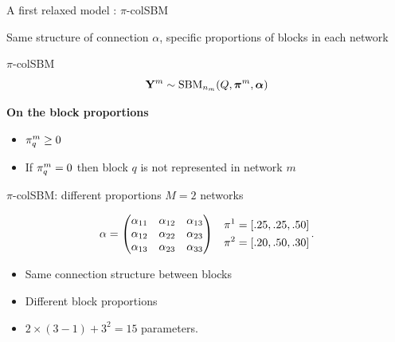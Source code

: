 \documentclass[compress,10pt]{beamer}
\begin{document}
\begin{frame}{A first relaxed model : $\pi$-colSBM}

Same structure of connection  $\alpha$, specific proportions of blocks in each network
 
 
\begin{block}{$\pi$-colSBM}
 \begin{equation*}\label{mod:iid}
\mathbf{Y}^m \sim \mbox{SBM}_{n_m}(Q, \boldsymbol{\pi}^m, \boldsymbol{\alpha})
\end{equation*}
 
\end{block}

\textbf{On the block proportions}
\begin{itemize}
\item  $\pi^{m}_q \geq 0$
\item If $\pi^{m}_q=0$ then  block $q$ is not represented in network $m$
\end{itemize}
\end{frame}

\begin{frame}{$\pi$-colSBM:  different proportions}
  $M=2$  networks 
 
\begin{eqnarray*}
   \alpha = \begin{pmatrix}
   \alpha_{11} & \alpha_{12} & \alpha_{13} \\
   \alpha_{12} & \alpha_{22} & \alpha_{23} \\
   \alpha_{13} & \alpha_{23} & \alpha_{33}
 \end{pmatrix} & &  \begin{aligned}
                      \pi^{1} = [.25, .25, .50] \\ \pi^{2} = [.20, .50, .30]
                    \end{aligned}\, . 
\end{eqnarray*}
\begin{itemize}
  \item Same connection structure between blocks
  \item Different block proportions
  \item $2\times(3-1) + 3^2 = 15$ parameters.
\end{itemize}


\end{frame}
\end{document}
